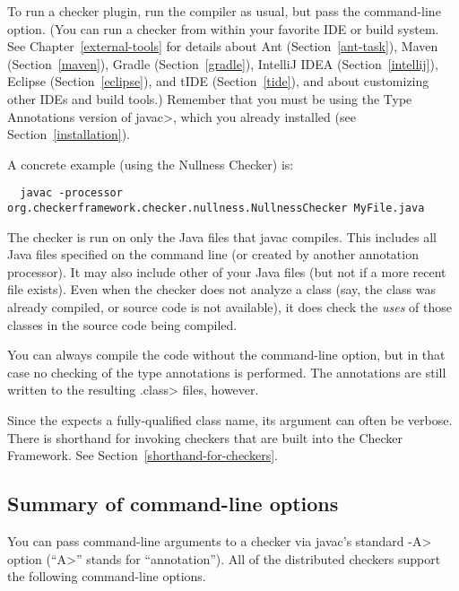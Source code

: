 To run a checker plugin, run the compiler  as usual,
but pass the  command-line
option.
(You can run a checker from within your favorite IDE or build system.  See
Chapter~\ref{external-tools} for details about
Ant (Section~\ref{ant-task}),
Maven (Section~\ref{maven}),
Gradle (Section~\ref{gradle}),
IntelliJ IDEA (Section~\ref{intellij}),
Eclipse (Section~\ref{eclipse}),
and
tIDE (Section~\ref{tide}), and about customizing other IDEs and build tools.)
Remember that you must be using the
Type Annotations version of \<javac>, which you already installed (see Section~\ref{installation}).

A concrete example (using the Nullness Checker) is:

\begin{smaller}
\begin{Verbatim}
  javac -processor org.checkerframework.checker.nullness.NullnessChecker MyFile.java
\end{Verbatim}
\end{smaller}

The checker is run on only the Java files that javac compiles.
This includes all Java files specified on the command line (or
created by another annotation processor).  It may also include other of
your Java files (but not if a more recent  file exists).
Even when the checker does not analyze a class (say, the class was
already compiled, or source code is not available), it does check
the \emph{uses} of those classes in the source code being compiled.

You can always compile the code without the 
command-line option, but in that case no checking of the type
annotations is performed.  The annotations are still written to the
resulting \<.class> files, however.

Since the  expects a fully-qualified class name,
its argument can often be verbose.  There is shorthand for invoking
checkers that are built into the Checker Framework.
See Section~\ref{shorthand-for-checkers}.

\subsection{Summary of command-line options\label{checker-options}}

You can pass command-line arguments to a checker via javac's standard \<-A>
option (``\<A>'' stands for ``annotation'').  All of the distributed
checkers support the following command-line options.

